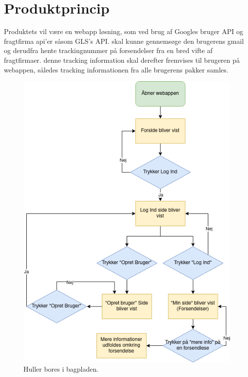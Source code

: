 \chapter{Produktprincip}
Produktets vil være en webapp løsning, som ved brug af Googles bruger API og fragtfirma api’er såsom GLS’s API. skal kunne gennemsøge den brugerens gmail og derudfra hente trackingnummer på forsendelser fra en bred vifte af fragtfirmaer. denne tracking information skal derefter fremvises til brugeren på webappen, således tracking informationen fra alle brugerens pakker samles.

\begin{figure}[h]
    \includegraphics[width=0.5\linewidth]{Pictures/flowchat-main.png}
    \centering
    \caption{Huller bores i bagpladen.}
     \label{fig:drill-backplate}
  \end{figure}
  